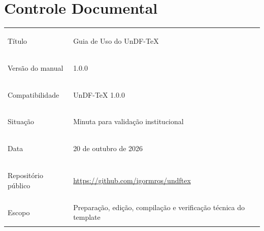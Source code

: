 \clearpage
\chapter*{Controle Documental}

\noindent\begin{tabularx}{\textwidth}{@{}>{\bfseries\raggedright\arraybackslash}p{}Y@{}}
\toprule
Título & Guia de Uso do UnDF-TeX \\
Versão do manual & 1.0.0 \\
Compatibilidade & UnDF-TeX 1.0.0 \\
Situação & Minuta para validação institucional \\
Data & 20 de outubro de 2026 \\
Repositório público & \url{https://github.com/igormrqs/undftex} \\
Escopo & Preparação, edição, compilação e verificação técnica do template \\
\bottomrule
\end{tabularx}
